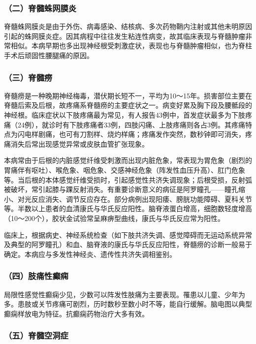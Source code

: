 \subsubsection{（二）脊髓蛛网膜炎}

脊髓蛛网膜炎是由于外伤、病毒感染、结核病、多次药物鞘内注射或其他未明原因引起的蛛网膜炎症。因其病程中往往发生粘连性病变，故其临床表现与脊髓肿瘤非常相似。本病早期也多出现神经根受刺激症状，表现也与脊髓肿瘤相似，也为脊柱手术后顽固性腰腿痛的原因。

\subsubsection{（三）脊髓痨}

脊髓痨是一种晚期神经梅毒，潜伏期长短不一，平均为10～15年。损害部位主要在脊髓后索及后根，故疼痛系脊髓痨的主要症状之一。病变好累及胸下段及腰骶段的神经根。临床症状以下肢疼痛最为常见，有人报告43例中，首发症状最多为下肢疼痛（24例），就诊时有下肢疼痛者33例，四肢闪痛、上肢疼痛则各占3例。其疼痛特点为闪电样剧痛，也可有刀割样、烧灼样痛；疼痛发作突然，数秒钟即可消失，疼痛消失后常出现感觉异常或皮肤血管扩张现象。

本病常由于后根的内脏感觉纤维受刺激而出现内脏危象，常表现为胃危象（剧烈的胃痛伴有呕吐）、喉危象、咽危象、交感神经危象（阵发性血压升高）、肛门危象等。当后根的本体感觉纤维受损时，引起感觉性共济失调现象；后根受损，反射弧被破坏，常引起膝与踝反射消失。有重要诊断意义的病征是阿罗瞳孔------瞳孔缩小、对光反应消失、调节反应存在。部分病例出现阳痿、膀胱功能障碍、夏科关节等。半数以上患者的血清康氏与华氏反应阳性。脑脊液蛋白增高，细胞数轻度增高（10～200个），胶状金试验常呈麻痹型曲线，康氏与华氏反应常为阳性。

临床上，根据病史、神经系统检查（如下肢共济失调、感觉障碍而无运动系统异常及典型的阿罗瞳孔）和血、脑脊液的康氏与华氏反应阳性，脊髓痨的诊断一般易于确定。本病应与多发性神经炎、遗传性共济失调相鉴别。

\subsubsection{（四）肢痛性癫痫}

局限性感觉性癫痫少见，少数可以阵发性肢痛为主要表现。罹患以儿童、少年为多。患肢或关节疼痛可剧烈，历时数秒至数小时不等，能自行缓解。脑电图以典型癫痫样放电为特征。抗癫痫药物治疗大多有效。

\subsubsection{（五）脊髓空洞症}

